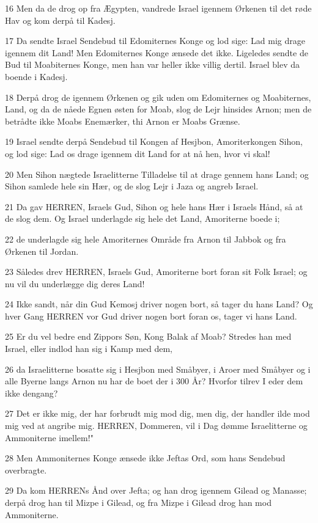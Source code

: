 \par 16 Men da de drog op fra Ægypten, vandrede Israel igennem Ørkenen til det røde Hav og kom derpå til Kadesj.
\par 17 Da sendte Israel Sendebud til Edomiternes Konge og lod sige: Lad mig drage igennem dit Land! Men Edomiternes Konge ænsede det ikke. Ligeledes sendte de Bud til Moabiternes Konge, men han var heller ikke villig dertil. Israel blev da boende i Kadesj.
\par 18 Derpå drog de igennem Ørkenen og gik uden om Edomiternes og Moabiternes, Land, og da de nåede Egnen østen for Moab, slog de Lejr hinsides Arnon; men de betrådte ikke Moabs Enemærker, thi Arnon er Moabs Grænse.
\par 19 Israel sendte derpå Sendebud til Kongen af Hesjbon, Amoriterkongen Sihon, og lod sige: Lad os drage igennem dit Land for at nå hen, hvor vi skal!
\par 20 Men Sihon nægtede Israelitterne Tilladelse til at drage gennem hans Land; og Sihon samlede hele sin Hær, og de slog Lejr i Jaza og angreb Israel.
\par 21 Da gav HERREN, Israels Gud, Sihon og hele hans Hær i Israels Hånd, så at de slog dem. Og Israel underlagde sig hele det Land, Amoriterne boede i;
\par 22 de underlagde sig hele Amoriternes Område fra Arnon til Jabbok og fra Ørkenen til Jordan.
\par 23 Således drev HERREN, Israels Gud, Amoriterne bort foran sit Folk Israel; og nu vil du underlægge dig deres Land!
\par 24 Ikke sandt, når din Gud Kemosj driver nogen bort, så tager du hans Land? Og hver Gang HERREN vor Gud driver nogen bort foran os, tager vi hans Land.
\par 25 Er du vel bedre end Zippors Søn, Kong Balak af Moab? Stredes han med Israel, eller indlod han sig i Kamp med dem,
\par 26 da Israelitterne bosatte sig i Hesjbon med Småbyer, i Aroer med Småbyer og i alle Byerne langs Arnon nu har de boet der i 300 År? Hvorfor tilrev I eder dem ikke dengang?
\par 27 Det er ikke mig, der har forbrudt mig mod dig, men dig, der handler ilde mod mig ved at angribe mig. HERREN, Dommeren, vil i Dag dømme Israelitterne og Ammoniterne imellem!"
\par 28 Men Ammoniternes Konge ænsede ikke Jeftas Ord, som hans Sendebud overbragte.
\par 29 Da kom HERRENs Ånd over Jefta; og han drog igennem Gilead og Manasse; derpå drog han til Mizpe i Gilead, og fra Mizpe i Gilead drog han mod Ammoniterne.
